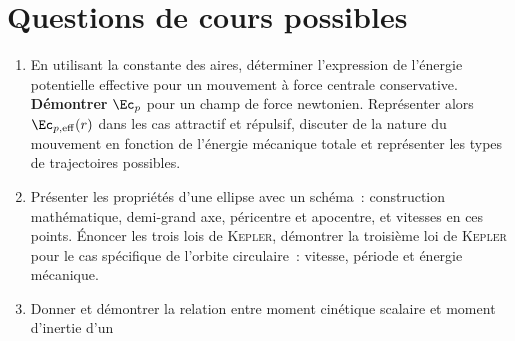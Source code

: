 \documentclass[a4paper, 12pt, final, garamond]{book}
\begin{document}
\section{Questions de cours possibles}
\begin{enumerate}[label=\sqenumi]
	\item En utilisant la constante des aires, déterminer l'expression de
	      l'énergie potentielle effective pour un mouvement à force centrale
	      conservative. \textbf{Démontrer} $\Ec_p$ pour un champ de force
	      newtonien. Représenter alors $\Ec_{p,\rm eff}(r)$ dans les cas attractif
	      et répulsif, discuter de la nature du mouvement en fonction de
	      l'énergie mécanique totale et représenter les types de trajectoires
	      possibles.
	\item Présenter les propriétés d'une ellipse avec un schéma~: construction
	      mathématique, demi-grand axe, péricentre et apocentre, et vitesses en ces
	      points. Énoncer les trois lois de \textsc{Kepler}, démontrer la troisième
	      loi de \textsc{Kepler} pour le cas spécifique de l'orbite circulaire~:
	      vitesse, période et énergie mécanique.
	\item Donner et démontrer la
	      relation entre moment cinétique scalaire et moment d'inertie d'un

\end{enumerate}
\end{document}
